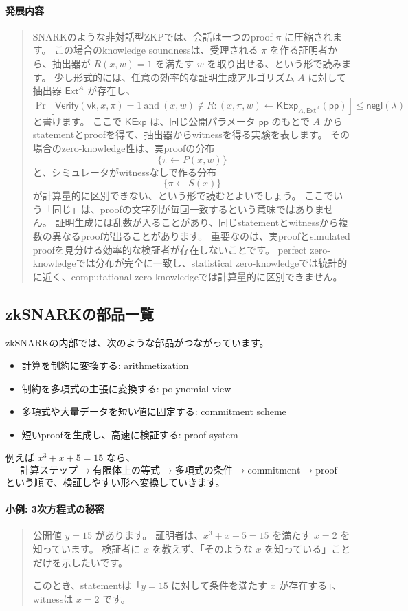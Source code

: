 \documentclass[a4paper,11pt]{ltjsarticle}
\newcommand{\Verify}{\mathsf{Verify}}
\newcommand{\Ext}{\mathsf{Ext}}
\newcommand{\negl}{\mathsf{negl}}
\newenvironment{examplebox}[1]{%
  \paragraph*{#1}\begin{quote}
}{%
  \end{quote}
}
\newenvironment{advancedbox}{%
  \paragraph*{発展内容}\begin{quote}
}{%
  \end{quote}
}
\begin{document}
\begin{advancedbox}
SNARKのような非対話型ZKPでは、会話は一つのproof \(\pi\) に圧縮されます。
この場合のknowledge soundnessは、受理される \(\pi\) を作る証明者から、抽出器が \(R(x,w)=1\) を満たす \(w\) を取り出せる、という形で読みます。
少し形式的には、任意の効率的な証明生成アルゴリズム \(A\) に対して抽出器 \(\Ext^A\) が存在し、
\[
  \Pr[
    \Verify(\mathsf{vk},x,\pi)=1
    \ \text{and}\
    (x,w)\notin R
    :
    (x,\pi,w)\leftarrow \mathsf{KExp}_{A,\Ext^A}(\mathsf{pp})
  ]
  \le \negl(\lambda)
\]
と書けます。
ここで \(\mathsf{KExp}\) は、同じ公開パラメータ \(\mathsf{pp}\) のもとで \(A\) からstatementとproofを得て、抽出器からwitnessを得る実験を表します。
その場合のzero-knowledge性は、実proofの分布
\[
  \{\pi \leftarrow P(x,w)\}
\]
と、シミュレータがwitnessなしで作る分布
\[
  \{\pi \leftarrow S(x)\}
\]
が計算量的に区別できない、という形で読むとよいでしょう。
ここでいう「同じ」は、proofの文字列が毎回一致するという意味ではありません。
証明生成には乱数が入ることがあり、同じstatementとwitnessから複数の異なるproofが出ることがあります。
重要なのは、実proofとsimulated proofを見分ける効率的な検証者が存在しないことです。
perfect zero-knowledgeでは分布が完全に一致し、statistical zero-knowledgeでは統計的に近く、computational zero-knowledgeでは計算量的に区別できません。
\end{advancedbox}

\subsection{zkSNARKの部品一覧}

zkSNARKの内部では、次のような部品がつながっています。

\begin{itemize}
  \item 計算を制約に変換する: arithmetization
  \item 制約を多項式の主張に変換する: polynomial view
  \item 多項式や大量データを短い値に固定する: commitment scheme
  \item 短いproofを生成し、高速に検証する: proof system
\end{itemize}

例えば \(x^3+x+5=15\) なら、
\[
  \text{計算ステップ}
  \longrightarrow
  \text{有限体上の等式}
  \longrightarrow
  \text{多項式の条件}
  \longrightarrow
  \text{commitment}
  \longrightarrow
  \text{proof}
\]
という順で、検証しやすい形へ変換していきます。

\begin{examplebox}{小例: 3次方程式の秘密}
公開値 \(y = 15\) があります。
証明者は、\(x^3 + x + 5 = 15\) を満たす \(x = 2\) を知っています。
検証者に \(x\) を教えず、「そのような \(x\) を知っている」ことだけを示したいです。

このとき、statementは「\(y=15\) に対して条件を満たす \(x\) が存在する」、
witnessは \(x=2\) です。
\end{examplebox}
\end{document}
